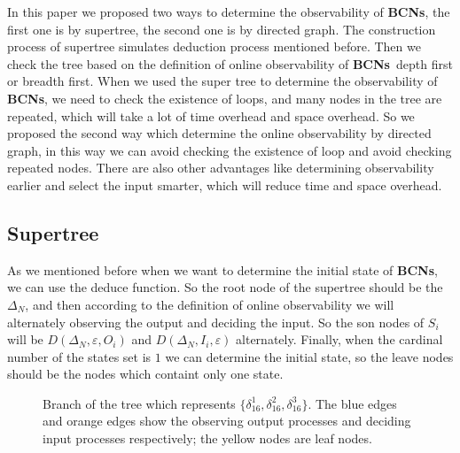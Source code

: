 \documentclass[letterpaper, 10 pt, conference]{ieeeconf}  %
\def \BCNs {{\bf BCNs}}
\begin{document}
In this paper we proposed two ways to determine the observability of {\bf BCNs}, the first one is by supertree, the second one is by directed graph. The construction process of supertree simulates deduction process mentioned before. Then we check the tree based on the definition of online observability of \BCNs\ depth first or breadth first. When we used the super tree to determine the observability of {\bf BCNs}, we need to check the existence of loops, and many nodes in the tree are repeated, which will take a lot of time overhead and space overhead. So we proposed the second way which determine the online observability by directed graph,   in this way we can avoid checking the existence of loop and avoid checking repeated nodes. There are also other advantages like determining observability earlier and select the input smarter, which will reduce time and space overhead.    

\subsection{Supertree} As we mentioned before when we want to determine the initial state of {\bf BCNs}, we can use the deduce function. So the root node of the supertree should be the $\Delta_N$, and then according to the definition of online observability we will alternately observing the output and deciding the input. So the son nodes of $S_i$ will be $D\left(\Delta_N,\varepsilon, O_i\right)$ and $D\left(\Delta_N,I_i,\varepsilon\right)$ alternately. Finally, when the  cardinal number of the states set is $1$ we can determine the initial state, so the leave nodes should be the nodes which containt only one state.
  \begin{figure}[thpb]
      \centering
      
      \caption{Branch of the tree which represents $\{\delta_{16}^1,\delta_{16}^2,\delta_{16}^3\}$. The blue edges and orange edges show the observing output processes and deciding input processes respectively; the yellow nodes are leaf nodes.}
      \label{fig:3}
   \end{figure}
\end{document}
